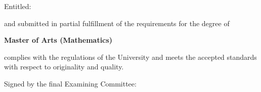 \documentclass[12pt, oneside]{report}   	%
\begin{document}
\vspace{0.5cm}

\noindent Entitled: 

\vspace{0.5cm}

\noindent and submitted in partial fulfillment of the requirements for the degree of
\begin{center}
\textbf{Master of Arts (Mathematics)} 
\end{center}

\vspace{0.5cm}

\noindent complies with the regulations of the University and meets the accepted standards with respect to originality and quality.

\vspace{0.5cm}

\noindent Signed by the final Examining Committee:\\
\end{document}
